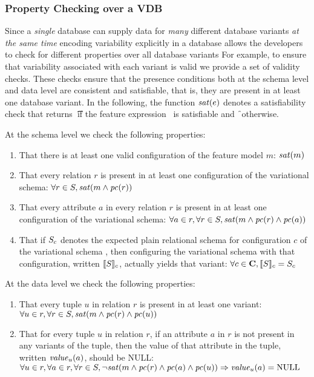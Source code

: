 \subsubsection{Property Checking over a VDB}
\label{sec:vdb-props}


Since
a \emph{single} database can supply data for \emph{many} different
database variants \emph{at the same time}
encoding variability explicitly in a database  allows the developers to 
check for different properties over all database variants
For example, to ensure that variability associated with each variant is 
valid we provide a set of validity checks.
These checks ensure that the presence conditions both at the schema level and
data level are consistent and satisfiable, that is, they are present in at
least one database variant. In the following, the function $\sat\dimMeta$
denotes a satisfiability check that returns \t\ if the feature expression
\dimMeta\ is satisfiable and \f\ otherwise.


At the schema level we check the following properties:
%
\begin{enumerate}
%
\item That there is at least one valid configuration of the feature model $m$:
%
$\sat\fModel$
%
\item That every relation $r$ is present in at least one configuration of the
variational schema:
%
$\forall\vRel\in\vSch, \sat{\fModel\wedge\getPC\vRel}$
%
\item That every attribute $a$ in every relation $r$ is present in at least one
configuration of the variational schema:
%
$\forall\vAtt\in\vRel, \forall\vRel\in\vSch,
\sat{\fModel\wedge\getPC\vRel\wedge\getPC\vAtt}$
%
\item That if $\vSch_\config$ denotes the expected plain relational schema for
configuration $c$ of the variational schema \vSch, then configuring the
variational schema with that configuration, written $\sem[\config]{\vSch}$,
actually yields that variant:
%
$\forall\config\in\confSet, \sem[\config]{\vSch} = \vSch_\config$
%
\end{enumerate}


\noindent
%
At the data level we check the following properties:
%
\begin{enumerate}
%
\item That every tuple $u$ in relation $r$ is present in at least one variant:
%
$\forall\vTuple\in\vRel, \forall\vRel\in\vSch,
\sat{\fModel\wedge\getPC\vRel\wedge\getPC\vTuple}$ 
%
\item That for every tuple $u$ in relation $r$, if an attribute $a$ in $r$ is
not present in any variants of the tuple, then the value of that attribute in
the tuple, written $\mathit{value}_\vTuple(\vAtt)$, should be NULL:
$\forall\vTuple\in\vRel, \forall\vAtt\in\vRel, \forall\vRel\in\vSch,
\neg\sat{\fModel\wedge\getPC\vRel\wedge\getPC\vAtt\wedge\getPC\vTuple}
\Rightarrow \mathit{value}_\vTuple(\vAtt) = \text{NULL}$
%
\end{enumerate}


